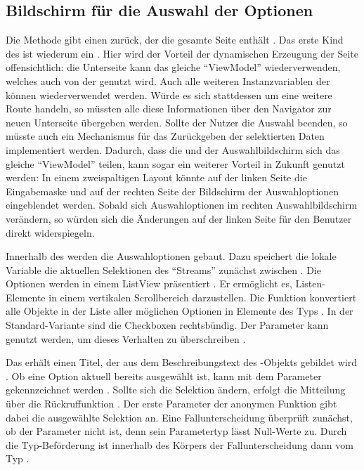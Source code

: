\subsection{Bildschirm für die Auswahl der Optionen}

 
Die Methode   gibt einen  zurück,
der die gesamte Seite enthält .
Das erste Kind des  ist wiederum ein  .
Hier wird der Vorteil der dynamischen Erzeugung der Seite offensichtlich: die Unterseite kann das gleiche \enquote{ViewModel} wiederverwenden, welches auch von der  genutzt wird.
Auch alle weiteren Instanzvariablen der  können wiederverwendet werden.
Würde es sich stattdessen um eine weitere Route handeln, so müssten alle diese Informationen über den Navigator zur neuen Unterseite übergeben werden.
Sollte der Nutzer die Auswahl beenden, so müsste auch ein Mechanismus für das Zurückgeben der selektierten Daten implementiert werden.
Dadurch, dass die  und der Auswahlbildschirm sich das gleiche \enquote{ViewModel} teilen,
kann sogar ein weiterer Vorteil in Zukunft genutzt werden:
In einem zweispaltigen Layout könnte auf der linken Seite die Eingabemaske und auf der rechten Seite der Bildschirm der Auswahloptionen eingeblendet werden.
Sobald sich Auswahloptionen im rechten Auswahlbildschirm verändern, so würden sich die Änderungen auf der linken Seite für den Benutzer direkt widerspiegeln.

Innerhalb des  werden die Auswahloptionen gebaut.
Dazu speichert die lokale Variable  die aktuellen Selektionen des \enquote{Streams} zunächst zwischen .
Die Optionen werden in einem ListView präsentiert .
Er ermöglicht es, Listen-Elemente in einem vertikalen Scrollbereich darzustellen.
Die Funktion  konvertiert alle Objekte in der Liste aller möglichen Optionen  in Elemente des Typs  .
In der Standard-Variante sind die Checkboxen rechtsbündig.
Der Parameter  kann genutzt werden, um dieses Verhalten zu überschreiben .

Das  erhält einen Titel, der aus dem Beschreibungstext  des -Objekts gebildet wird .
Ob eine Option aktuell bereits ausgewählt ist, kann mit dem Parameter  gekennzeichnet werden .
Sollte sich die Selektion ändern, erfolgt die Mitteilung über die Rückruffunktion  .
Der erste Parameter der anonymen Funktion gibt dabei die ausgewählte Selektion an.
Eine Fallunterscheidung überprüft zunächst, ob der Parameter  nicht  ist, denn sein Parametertyp  lässt Null-Werte zu.
Durch die Typ-Beförderung ist  innerhalb des Körpers der Fallunterscheidung dann vom Typ  . 


